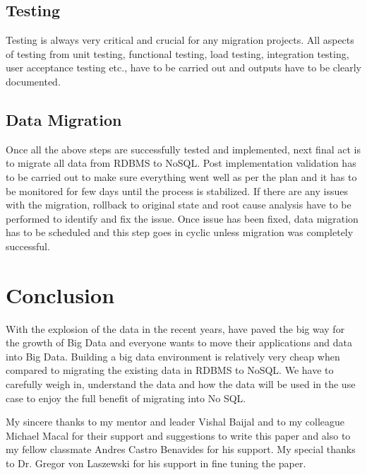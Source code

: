 \documentclass[sigconf]{acmart}
\begin{document}
\subsection{Testing} 

Testing is always very critical and crucial for any migration projects. All aspects of testing from unit testing, functional testing, load testing, integration testing, user acceptance testing etc., have to be carried out and outputs have to be clearly documented. 

\subsection{Data Migration} 

Once all the above steps are successfully tested and implemented, next final act is to migrate all data from RDBMS to NoSQL. Post implementation validation has to be carried out to make sure everything went well as per the plan and it has to be monitored for few days until the process is stabilized. If there are any issues with the migration, rollback to original state and root cause analysis have to be performed to identify and fix the issue. Once issue has been fixed, data migration has to be scheduled and this step goes in cyclic unless migration was completely successful. 

\section{Conclusion}

With the explosion of the data in the recent years, have paved the big way for the growth of Big Data and everyone wants to move their applications and data into Big Data. Building a big data environment is relatively very cheap when compared to migrating the existing data in RDBMS to NoSQL. We have to carefully weigh in, understand the data and how the data will be used in the use case to enjoy the full benefit of migrating into No SQL.

\begin{acks}

My sincere thanks to my mentor and leader Vishal Baijal and to my colleague Michael Macal for their support and suggestions to write this paper and also to my fellow classmate Andres Castro Benavides for his support. My special thanks to Dr. Gregor von Laszewski for his support in fine tuning the paper.

\end{acks}


 
\end{document}
